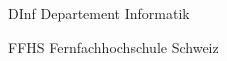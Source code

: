 \begin{glossar}[Prioritätenskala] %
    \item[DInf]             Departement Informatik
    \item[FFHS]             Fernfachhochschule Schweiz
\end{glossar}
